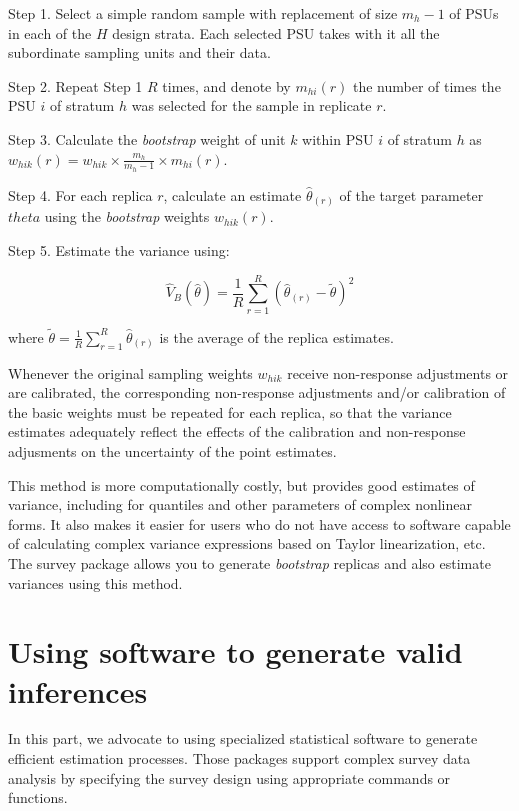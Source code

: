 \documentclass[
  12pt,
]{book}
\begin{document}
Step 1. Select a simple random sample with replacement of size \(m_h - 1\) of PSUs in each of the \(H\) design strata. Each selected PSU takes with it all the subordinate sampling units and their data.

Step 2. Repeat Step 1 \(R\) times, and denote by \(m_{hi}(r)\) the number of times the PSU \(i\) of stratum \(h\) was selected for the sample in replicate \(r\).

Step 3. Calculate the \emph{bootstrap} weight of unit \(k\) within PSU \(i\) of stratum \(h\) as \(w_{hik} (r) = w_{hik} \times \frac {m_h}{m_h - 1} \times m_{hi}(r)\).

Step 4. For each replica \(r\), calculate an estimate \(\widehat \theta_{(r)}\) of the target parameter \(theta\) using the \emph{bootstrap} weights \(w_{hik} (r)\).

Step 5. Estimate the variance using:

\[
\widehat V_{B} \left( \widehat \theta \right) = \frac {1} {R} \sum_{r=1}^R \left( \widehat \theta_{(r)} - \tilde \theta \right)^2
\]

where \(\tilde \theta = \frac 1 R \sum_{r=1}^R \widehat \theta_{(r)}\) is the average of the replica estimates.

Whenever the original sampling weights \(w_{hik}\) receive non-response adjustments or are calibrated, the corresponding non-response adjustments and/or calibration of the basic weights must be repeated for each replica, so that the variance estimates adequately reflect the effects of the calibration and non-response adjusments on the uncertainty of the point estimates.

This method is more computationally costly, but provides good estimates of variance, including for quantiles and other parameters of complex nonlinear forms. It also makes it easier for users who do not have access to software capable of calculating complex variance expressions based on Taylor linearization, etc. The survey package allows you to generate \emph{bootstrap} replicas and also estimate variances using this method.

\hypertarget{using-software-to-generate-valid-inferences}{%
\section{Using software to generate valid inferences}\label{using-software-to-generate-valid-inferences}}

In this part, we advocate to using specialized statistical software to generate efficient estimation processes. Those packages support complex survey data analysis by specifying the survey design using appropriate commands or functions.
\end{document}
